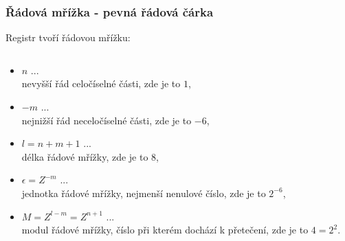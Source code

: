   \begin{frame}
    \frametitle{Řádová mřížka - pevná řádová čárka}
		
		\begin{minipage}[t][0.2\textheight][t]{\textwidth}
      \boldmath
			\small
      Registr tvoří řádovou mřížku:
      \begin{center}
        \begin{tabular}{| p{5mm} | p{5mm} || p{5mm} | p{5mm} | p{5mm} | p{5mm} | p{5mm} | p{5mm} |}
				 \hline
          & & & & & & & \\
         \hline
        \end{tabular}
      \end{center}
		\end{minipage}
    
		\begin{minipage}[t][0.7\textheight][t]{\textwidth}
		\boldmath
		\small
      \begin{itemize}
        \item $n$ ...\\ nevyšší řád celočíselné části, zde je to $1$, 
        \item $-m$ ...\\ nejnižší řád neceločíselné části, zde je to $-6$,
        \item $l = n + m + 1$ ...\\ délka řádové mřížky, zde je to $8$,
        \item $\epsilon = Z^{-m}$ ...\\ jednotka řádové mřížky, nejmenší nenulové číslo, zde je to $2^{-6}$,
				\item $M=Z^{l-m}=Z^{n+1}$ ...\\ modul řádové mřížky, číslo při kterém dochází k přetečení, zde je to $4 = 2^{2}$.
      \end{itemize}
		\end{minipage}
		
	\end{frame}
	
